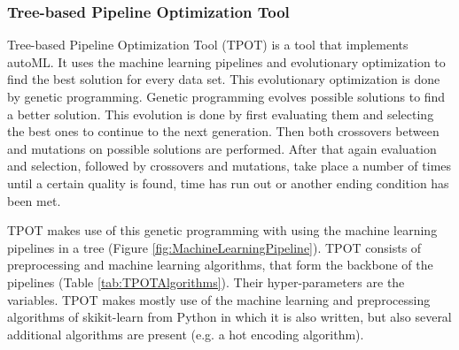 \documentclass[10pt,a4paper]{report}
\begin{document}
	
	\subsubsection{Tree-based Pipeline Optimization Tool}
	\label{FSsubsec:TPOT}
	
	Tree-based Pipeline Optimization Tool (TPOT) is a tool that implements autoML. It uses the machine learning pipelines and evolutionary optimization to find the best solution for every data set. This evolutionary optimization is done by genetic programming. Genetic programming evolves possible solutions to find a better solution. This evolution is done by first evaluating them and selecting the best ones to continue to the next generation. Then both crossovers between and mutations on possible solutions are performed. After that again evaluation and selection, followed by crossovers and mutations, take place a number of times until a certain quality is found, time has run out or another ending condition has been met.
	
	TPOT makes use of this genetic programming with using the machine learning pipelines in a tree (Figure \ref{fig:MachineLearningPipeline}). TPOT consists of preprocessing and machine learning algorithms, that form the backbone of the pipelines (Table \ref{tab:TPOTAlgorithms}). Their hyper-parameters are the variables. TPOT makes mostly use of the machine learning and preprocessing algorithms of skikit-learn from Python in which it is also written, but also several additional algorithms are present (e.g. a hot encoding algorithm).
	
\end{document}
